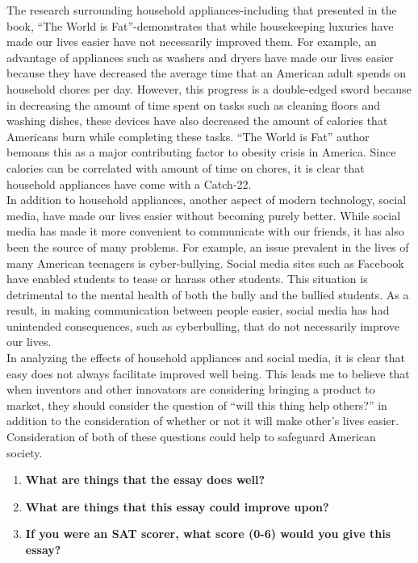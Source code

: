\indent The research surrounding household appliances-including that presented in the book, “The World is Fat”-demonstrates that while housekeeping luxuries have made our lives easier have not necessarily improved them. For example, an advantage of appliances such as washers and dryers have made our lives easier because they have decreased the average time that an American adult spends on household chores per day. However, this progress is a double-edged sword because in decreasing the amount of time spent on tasks such as cleaning floors and washing dishes, these devices have also decreased the amount of calories that Americans burn while completing these tasks. “The World is Fat” author bemoans this as a major contributing factor to obesity crisis in America. Since calories can be correlated with amount of time on chores, it is clear that household appliances have come with a Catch-22. \\

\indent In addition to household appliances, another aspect of modern technology, social media, have made our lives easier without becoming purely better. While social media has made it more convenient to communicate with our friends, it has also been the source of many problems. For example, an issue prevalent in the lives of many American teenagers is cyber-bullying. Social media sites such as Facebook have enabled students to tease or harass other students. This situation is detrimental to the mental health of both the bully and the bullied students. As a result, in making communication between people easier, social media has had unintended consequences, such as cyberbulling, that do not necessarily improve our lives. \\

\indent In analyzing the effects of household appliances and social media, it is clear that easy does not always facilitate improved well being. This leads me to believe that when inventors and other innovators are considering bringing a product to market, they should consider the question of “will this thing help others?” in addition to the consideration of whether or not it will make other's lives easier. Consideration of both of these questions could help to safeguard American society.  

\bigskip
\begin{enumerate}
\item{\textbf{What are things that the essay does well?}}
\vfill
\item{\textbf{What are things that this essay could improve upon?}}
\vfill
\item{\textbf{If you were an SAT scorer, what score (0-6) would you give this essay?}}
\vfill
\end{enumerate}

